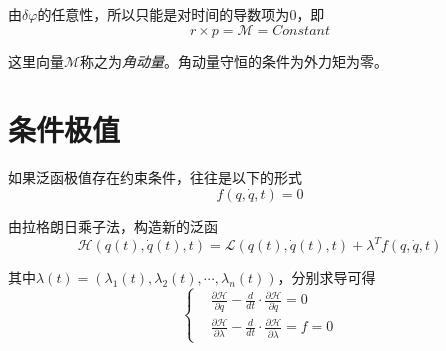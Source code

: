 由$\delta\varphi$的任意性，所以只能是对时间的导数项为$0$，即
\begin{equation}
    r\times p=\mathcal{M}=Constant
\end{equation}

这里向量$\mathcal{M}$称之为\textsl{角动量}。角动量守恒的条件为外力矩为零。


\section{条件极值}

如果泛函极值存在约束条件，往往是以下的形式
\begin{equation}
    f(q,\dot{q},t)=0
\end{equation}

由拉格朗日乘子法，构造新的泛函
\begin{equation}
    \mathcal{H}(q(t),\dot{q}(t),t)=\mathcal{L}(q(t),\dot{q}(t),t)+\lambda^T f(q,\dot{q},t)
\end{equation}

其中$\lambda(t)=(\lambda_1(t),\lambda_2(t),\cdots,\lambda_n(t))$，分别求导可得
\begin{equation}
    \left\{ 
        \begin{aligned}
        & \frac{\partial \mathcal{H}}{\partial q}-\frac{d}{dt}\cdot \frac{\partial \mathcal{H}}{\partial \dot{q}}=0\\
        & \frac{\partial \mathcal{H}}{\partial \lambda}-\frac{d}{dt}\cdot \frac{\partial \mathcal{H}}{\partial \dot{\lambda}}=f=0
    \end{aligned}
    \right.
\end{equation}

